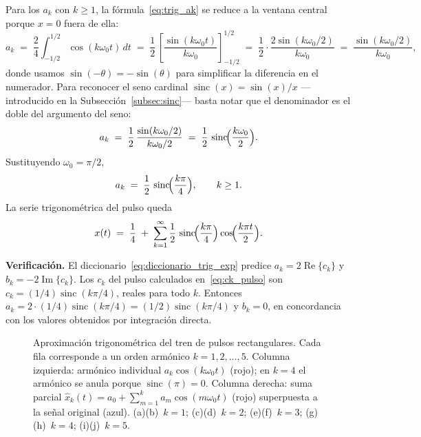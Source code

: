 \documentclass[class=book, crop=false]{standalone}
\begin{document}
Para los $a_k$ con $k\geq 1$, la fórmula~\eqref{eq:trig_ak} se
reduce a la ventana central porque $x = 0$ fuera de ella:
\begin{equation*}
    a_k \;=\; \frac{2}{4}\int_{-1/2}^{1/2}\cos(k\omega_0 t)\,dt
        \;=\; \frac{1}{2}\,
            \left[\frac{\sin(k\omega_0 t)}{k\omega_0}\right]_{-1/2}^{1/2}
        \;=\; \frac{1}{2}\cdot\frac{2\sin(k\omega_0/2)}{k\omega_0}
        \;=\; \frac{\sin(k\omega_0/2)}{k\omega_0},
\end{equation*}
donde usamos $\sin(-\theta) = -\sin(\theta)$ para simplificar la
diferencia en el numerador. Para reconocer el seno cardinal
$\operatorname{sinc}(x) = \sin(x)/x$ ---introducido en la
Subsección~\ref{subsec:sinc}--- basta notar que el denominador es el
doble del argumento del seno:
\begin{equation*}
    a_k \;=\; \frac{1}{2}\,\frac{\sin(k\omega_0/2)}{k\omega_0/2}
        \;=\; \frac{1}{2}\,\operatorname{sinc}\!\Bigl(\frac{k\omega_0}{2}\Bigr).
\end{equation*}
Sustituyendo $\omega_0 = \pi/2$,
\begin{equation}
    a_k \;=\; \frac{1}{2}\,\operatorname{sinc}\!\Bigl(\frac{k\pi}{4}\Bigr),
    \qquad k\geq 1.
    \label{eq:ak_pulso}
\end{equation}
La serie trigonométrica del pulso queda
\begin{equation*}
    x(t) \;=\; \frac{1}{4} \;+\;
        \sum_{k=1}^{\infty}
        \frac{1}{2}\,\operatorname{sinc}\!\Bigl(\frac{k\pi}{4}\Bigr)
        \cos\!\Bigl(\frac{k\pi t}{2}\Bigr).
\end{equation*}

\textbf{Verificación.} El diccionario~\eqref{eq:diccionario_trig_exp}
predice $a_k = 2\operatorname{Re}\{c_k\}$ y
$b_k = -2\operatorname{Im}\{c_k\}$. Los $c_k$ del pulso calculados
en~\eqref{eq:ck_pulso} son $c_k = (1/4)\operatorname{sinc}(k\pi/4)$,
reales para todo $k$. Entonces
$a_k = 2\cdot(1/4)\operatorname{sinc}(k\pi/4) = (1/2)\operatorname{sinc}(k\pi/4)$
y $b_k = 0$, en concordancia con los valores obtenidos por
integración directa.

\begin{figure}[H]
    \centering
    \begin{minipage}{\linewidth}
        \centering
        
        \caption{Aproximación trigonométrica del tren de pulsos
                 rectangulares. Cada fila corresponde a un orden
                 armónico $k = 1, 2, \dots, 5$. Columna izquierda:
                 armónico individual $a_k\cos(k\omega_0 t)$ (rojo);
                 en $k=4$ el armónico se anula porque
                 $\operatorname{sinc}(\pi) = 0$. Columna derecha:
                 suma parcial $\hat x_k(t) = a_0 + \sum_{m=1}^{k}
                 a_m\cos(m\omega_0 t)$ (rojo) superpuesta a la señal
                 original (azul). (a)(b)~$k=1$; (c)(d)~$k=2$;
                 (e)(f)~$k=3$; (g)(h)~$k=4$; (i)(j)~$k=5$.}
        \label{fig:aprox_trig_pulso}
    \end{minipage}
\end{figure}
\end{document}
